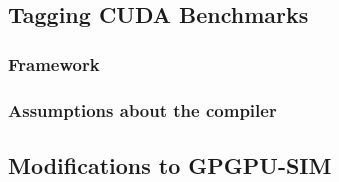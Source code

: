 %
%

\subsection{Tagging CUDA Benchmarks}
	
	\subsubsection*{Framework}	%

	\subsubsection*{Assumptions about the compiler}

\subsection{Modifications to GPGPU-SIM}

